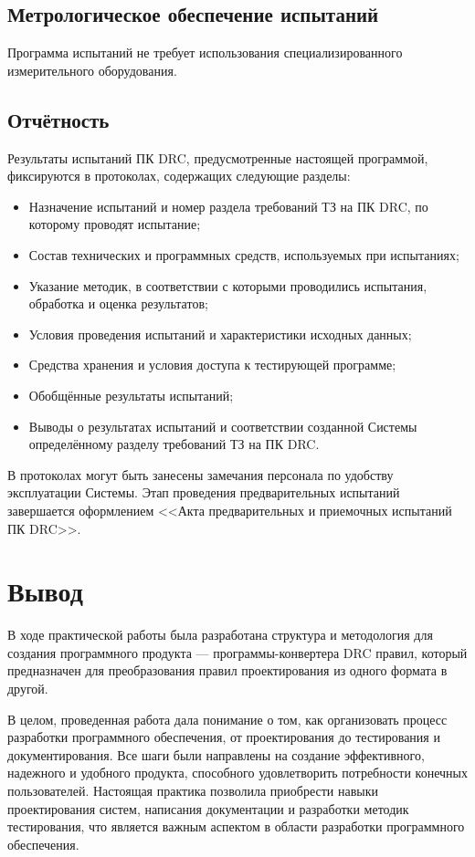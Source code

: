 \subsection{Метрологическое обеспечение испытаний}

Программа испытаний не требует
использования специализированного измерительного оборудования.

\subsection{Отчётность}

Результаты испытаний ПК DRC, предусмотренные настоящей программой,
фиксируются в протоколах, содержащих следующие разделы:

\begin{itemize}
	\item Назначение испытаний и номер раздела требований ТЗ на ПК DRC,
		по которому проводят испытание;
	\item Состав технических и программных средств,
		используемых при испытаниях;
	\item Указание методик, в соответствии с которыми проводились испытания,
		обработка и оценка результатов;
	\item Условия проведения испытаний и характеристики исходных данных;
	\item Средства хранения и условия доступа к тестирующей программе;
	\item Обобщённые результаты испытаний;
	\item Выводы о результатах испытаний
		и соответствии созданной Системы
		определённому разделу требований ТЗ на ПК DRC.
\end{itemize}

В протоколах могут быть занесены замечания персонала
по удобству эксплуатации Системы.
Этап проведения предварительных испытаний завершается
оформлением <<Акта предварительных и приемочных испытаний ПК DRC>>.

\clearpage

\section*{\LARGE Вывод}

В ходе практической работы была разработана структура и методология
для создания программного продукта --- программы-конвертера DRC правил,
который предназначен для преобразования правил проектирования
из одного формата в другой.\par
В целом, проведенная работа дала понимание о том,
как организовать процесс разработки программного обеспечения,
от проектирования до тестирования и документирования.
Все шаги были направлены на создание эффективного,
надежного и удобного продукта,
способного удовлетворить потребности конечных пользователей.
Настоящая практика позволила приобрести навыки проектирования систем,
написания документации и разработки методик тестирования,
что является важным аспектом в области разработки программного обеспечения.

